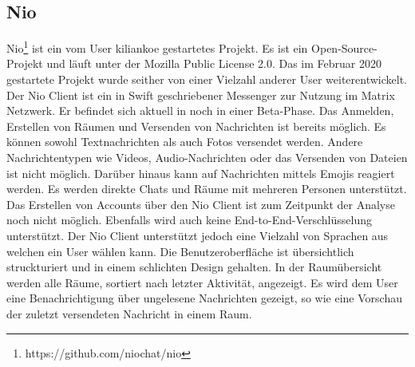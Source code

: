     \subsection{Nio}
    Nio\footnote{https://github.com/niochat/nio} ist ein vom User kiliankoe gestartetes Projekt.
    Es ist ein Open-Source-Projekt und läuft unter der Mozilla Public License 2.0.
    Das im Februar 2020 gestartete Projekt wurde seither von einer Vielzahl anderer User weiterentwickelt.
    Der Nio Client ist ein in Swift geschriebener Messenger zur Nutzung im Matrix Netzwerk.
    Er befindet sich aktuell in noch in einer Beta-Phase.
    Das Anmelden, Erstellen von Räumen und Versenden von Nachrichten ist bereits möglich.
    Es können sowohl Textnachrichten als auch Fotos versendet werden.
    Andere Nachrichtentypen wie Videos, Audio-Nachrichten oder das Versenden von Dateien ist nicht möglich.
    Darüber hinaus kann auf Nachrichten mittels Emojis reagiert werden.
    Es werden direkte Chats und Räume mit mehreren Personen unterstützt.
    Das Erstellen von Accounts über den Nio Client ist zum Zeitpunkt der Analyse noch nicht möglich.
    Ebenfalls wird auch keine End-to-End-Verschlüsselung unterstützt.
    Der Nio Client unterstützt jedoch eine Vielzahl von Sprachen aus welchen ein User wählen kann.
    Die Benutzeroberfläche ist übersichtlich struckturiert und in einem schlichten Design gehalten.
    In der Raumübersicht werden alle Räume, sortiert nach letzter Aktivität, angezeigt.
    Es wird dem User eine Benachrichtigung über ungelesene Nachrichten gezeigt, so wie eine Vorschau der zuletzt versendeten Nachricht in einem Raum.

    \newpage
